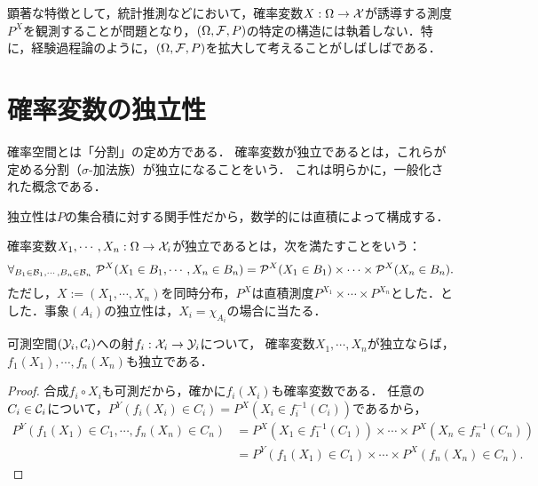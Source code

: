 \documentclass[uplatex,dvipdfmx]{jsreport}
\begin{document}
顕著な特徴として，統計推測などにおいて，確率変数$X:\Omega\to\mathcal{X}$が誘導する測度$P^X$を観測することが問題となり，$(\Omega,\mathcal{F},P)$の特定の構造には執着しない．特に，経験過程論のように，$(\Omega,\mathcal{F},P)$を拡大して考えることがしばしばである．

\section{確率変数の独立性}

\begin{tcolorbox}[colframe=ForestGreen, colback=ForestGreen!10!white,breakable,colbacktitle=ForestGreen!40!white,coltitle=black,fonttitle=\bfseries\sffamily,
title=]
    確率空間とは「分割」の定め方である．
    確率変数が独立であるとは，これらが定める分割（$\sigma$-加法族）が独立になることをいう．
    これは明らかに，一般化された概念である．

    独立性は$P$の集合積に対する関手性だから，数学的には直積によって構成する．
\end{tcolorbox}

\begin{definition}[independent]\label{def-independentness-of-random-variables}
    確率変数$X_1,\cdots,X_n:\Omega\to\mathcal{X}_i$が独立であるとは，次を満たすことをいう：
    \[\forall_{B_1\in\mathcal{B}_1,\cdots,B_n\in\mathcal{B}_n}\;\mathcal{P}^X(X_1\in B_1,\cdots,X_n\in B_n)=\mathcal{P}^X(X_1\in B_1)\times\cdots\times\mathcal{P}^X(X_n\in B_n).\]
    ただし，$X:=(X_1,\cdots,X_n)$を同時分布，$P^X$は直積測度$P^{X_1}\times\cdots\times P^{X_n}$とした．とした．事象$(A_i)$の独立性は，$X_i=\chi_{A_i}$の場合に当たる．
\end{definition}

\begin{proposition}[可測関数は独立性を保つ]\label{prop-measurable-functions-perserve-independentness}
    可測空間$(\mathcal{Y}_i,\mathcal{C}_i)$への射$f_i:\mathcal{X}_i\to\mathcal{Y}_i$について，
    確率変数$X_1,\cdots,X_n$が独立ならば，$f_1(X_1),\cdots,f_n(X_n)$も独立である．
\end{proposition}
\begin{proof}
    合成$f_i\circ X_i$も可測だから，確かに$f_i(X_i)$も確率変数である．
    任意の$C_i\in\mathcal{C}_i$について，$P^Y(f_i(X_i)\in C_i)=P^X(X_i\in f^{-1}_i(C_i))$であるから，
    \begin{align*}
        P^Y(f_1(X_1)\in C_1,\cdots,f_n(X_n)\in C_n)&=P^X(X_1\in f^{-1}_1(C_1))\times\cdots\times P^X(X_n\in f^{-1}_n(C_n))\\
        &=P^Y(f_1(X_1)\in C_1)\times\cdots\times P^X(f_n(X_n)\in C_n).
    \end{align*}
\end{proof}
\end{document}
